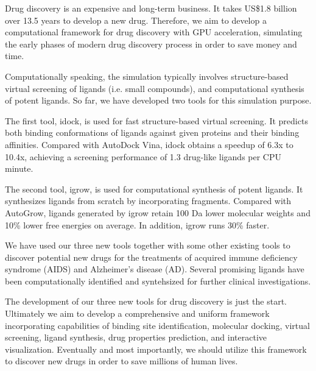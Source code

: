 Drug discovery is an expensive and long-term business. It takes US\$1.8 billion over 13.5 years to develop a new drug. Therefore, we aim to develop a computational framework for drug discovery with GPU acceleration, simulating the early phases of modern drug discovery process in order to save money and time.

Computationally speaking, the simulation typically involves structure-based virtual screening of ligands (i.e. small compounds), and computational synthesis of potent ligands. So far, we have developed two tools for this simulation purpose.

The first tool, idock, is used for fast structure-based virtual screening. It predicts both binding conformations of ligands against given proteins and their binding affinities. Compared with AutoDock Vina, idock obtains a speedup of 6.3x to 10.4x, achieving a screening performance of 1.3 drug-like ligands per CPU minute.

The second tool, igrow, is used for computational synthesis of potent ligands. It synthesizes ligands from scratch by incorporating fragments. Compared with AutoGrow, ligands generated by igrow retain 100 Da lower molecular weights and 10\% lower free energies on average. In addition, igrow runs 30\% faster.

We have used our three new tools together with some other existing tools to discover potential new drugs for the treatments of acquired immune deficiency syndrome (AIDS) and Alzheimer's disease (AD). Several promising ligands have been computationally identified and syntehsized for further clinical investigations.

The development of our three new tools for drug discovery is just the start. Ultimately we aim to develop a comprehensive and uniform framework incorporating capabilities of binding site identification, molecular docking, virtual screening, ligand synthesis, drug properties prediction, and interactive visualization. Eventually and most importantly, we should utilize this framework to discover new drugs in order to save millions of human lives.

